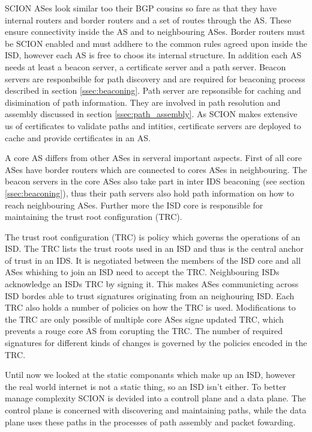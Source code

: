 \documentclass[../eva1_scion.tex]{subfiles}
\begin{document}
    SCION ASes look similar too their BGP cousins so fare as that they have internal routers and border routers and a set of routes through the AS. These ensure connectivity inside the AS and to neighbouring ASes. Border routers must be SCION enabled and must addhere to the common rules agreed upon inside the ISD, however each AS is free to choos its internal structure. In addition each AS needs at least a beacon server, a certificate server and a path server. Beacon servers are responbsible for path discovery and are required for beaconing process described in section \ref{ssec:beaconing}. Path server are repsonsible for caching and disimination of path information. They are involved in path resolution and assembly discussed in section \ref{ssec:path_assembly}. As SCION makes extensive us of certificates to validate paths and intities, certificate servers are deployed to cache and provide certificates in an AS.
    
    A core AS differs from other ASes in serveral important aspects. First of all core ASes have border routers which are connected to cores ASes in neighbouring. The beacon servers in the core ASes also take part in inter IDS beaconing (see section \ref{ssec:beaconing}), thus their path servers also hold path information on how to reach neighbouring ASes. Further more the ISD core is responsible for maintaining the trust root configuration (TRC).

    The trust root configuration (TRC) is policy which governs the operations of an ISD. The TRC lists the trust roots used in an ISD and thus is the central anchor of trust in an IDS. It is negotiated between the members of the ISD core and all ASes whishing to join an ISD need to accept the TRC. Neighbouring ISDs acknowledge an ISDs TRC by signing it. This makes ASes communicting across ISD bordes able to trust signatures originating from an neighouring ISD. Each TRC also holds a number of policies on how the TRC is used. Modifications to the TRC are only possible of multiple core ASes signe updated TRC, which prevents a rouge core AS from corupting the TRC. The number of required signatures for different kinds of changes is governed by the policies encoded in the TRC.

    Until now we looked at the static componants which make up an ISD, however the real world internet is not a static thing, so an ISD isn't either. To better manage complexity SCION is devided into a controll plane and a data plane. The control plane is concerned with discovering and maintaining paths, while the data plane uses these paths in the processes of path assembly and packet fowarding.
\end{document}
